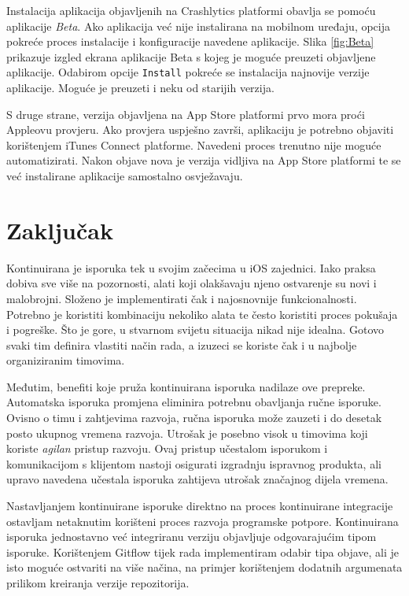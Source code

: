 \documentclass[times, utf8, diplomski, numeric]{fer}
\begin{document}
Instalacija aplikacija objavljenih na Crashlytics platformi obavlja se pomoću aplikacije \textit{Beta}. Ako aplikacija već nije instalirana na mobilnom uređaju, opcija pokreće proces instalacije i konfiguracije navedene aplikacije. Slika \ref{fig:Beta} prikazuje izgled ekrana aplikacije Beta s kojeg je moguće preuzeti objavljene aplikacije. Odabirom opcije \verb|Install| pokreće se instalacija najnovije verzije aplikacije. Moguće je preuzeti i neku od starijih verzija.

S druge strane, verzija objavljena na App Store platformi prvo mora proći Appleovu provjeru. Ako provjera uspješno završi, aplikaciju je potrebno objaviti korištenjem iTunes Connect platforme. Navedeni proces trenutno nije moguće automatizirati. Nakon objave nova je verzija vidljiva na App Store platformi te se već instalirane aplikacije samostalno osvježavaju.

\chapter{Zaključak}

Kontinuirana je isporuka tek u svojim začecima u iOS zajednici. Iako praksa dobiva sve više na pozornosti, alati koji olakšavaju njeno ostvarenje su novi i malobrojni. Složeno je implementirati čak i najosnovnije funkcionalnosti. Potrebno je koristiti kombinaciju nekoliko alata te često koristiti proces pokušaja i pogreške. Što je gore, u stvarnom svijetu situacija nikad nije idealna. Gotovo svaki tim definira vlastiti način rada, a izuzeci se koriste čak i u najbolje organiziranim timovima.

Međutim, benefiti koje pruža kontinuirana isporuka nadilaze ove prepreke. Automatska isporuka promjena eliminira potrebnu obavljanja ručne isporuke. Ovisno o timu i zahtjevima razvoja, ručna isporuka može zauzeti i do desetak posto ukupnog vremena razvoja. Utrošak je posebno visok u timovima koji koriste \textit{agilan} pristup razvoju. Ovaj pristup učestalom isporukom i komunikacijom s klijentom nastoji osigurati izgradnju ispravnog produkta, ali upravo navedena učestala isporuka zahtijeva utrošak značajnog dijela vremena.

Nastavljanjem kontinuirane isporuke direktno na proces kontinuirane integracije ostavljam netaknutim korišteni proces razvoja programske potpore. Kontinuirana isporuka jednostavno već integriranu verziju objavljuje odgovarajućim tipom isporuke. Korištenjem Gitflow tijek rada implementiram odabir tipa objave, ali je isto moguće ostvariti na više načina, na primjer korištenjem dodatnih argumenata prilikom kreiranja verzije repozitorija.
\end{document}
